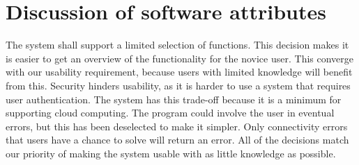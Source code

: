 \documentclass[a4paper,10pt,titlepage]{article}
\begin{document}
\section{Discussion of software attributes}
	The system shall support a limited selection of functions. This decision makes it is easier to get an overview of the functionality for the novice user. This converge with our usability requirement, because users with limited knowledge will benefit from this. Security hinders usability, as it is harder to use a system that requires user authentication. The system has this trade-off because it is a minimum for supporting cloud computing. The program could involve the user in eventual errors, but this has been deselected to make it simpler. Only connectivity errors that users have a chance to solve will return an error. All of the decisions match our priority of making the system usable with as little knowledge as possible.
\end{document}

